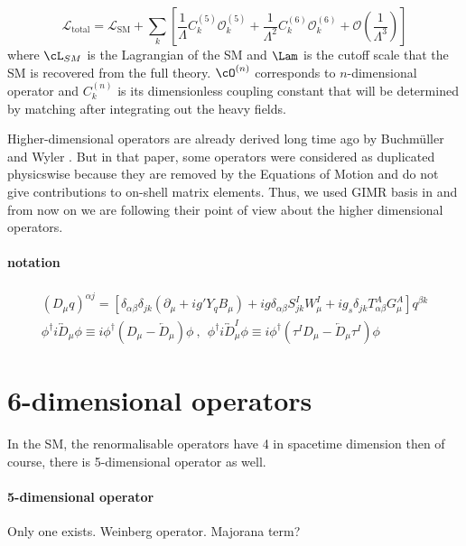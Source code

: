 \begin{equation} 
\mathcal{L}_{\mathrm{total}} = \mathcal{L}_{\mathrm{SM}} 
+ \sum_{k}\left[ \frac{1}{\Lambda} C_k^{(5)} \mathcal{O}_k^{(5)}
+ \frac{1}{\Lambda^2} C_k^{(6)} \mathcal{O}_k^{(6)} + \mathcal{O}\left(\frac{1}{\Lambda^3}\right) \right]
\end{equation}
where $\cL_{SM}$ is the Lagrangian of the SM and $\Lam$ is the cutoff scale that the SM is recovered from the full theory.
$\cO^{(n)}$ corresponds to $n$-dimensional operator 
and $C_k^{(n)}$ is its dimensionless coupling constant
that will be determined by matching after integrating out the heavy fields. 

Higher-dimensional operators are already derived long time ago by Buchm\"{u}ller and Wyler .
But in that paper, some operators were considered as duplicated physicswise
because they are removed by the Equations of Motion and do not give contributions to on-shell matrix elements.
Thus, we used GIMR basis in  and from now on we are following their point of view about the higher dimensional operators. 


\paragraph{notation}
\begin{align}
 (D_\mu q)^{\alpha j} = [\delta_{\alpha \beta} \delta_{jk}(\partial_\mu + ig'Y_qB_\mu)
  + ig \delta_{\alpha\beta}S_{jk}^I W_\mu^I + ig_s \delta_{jk} T_{\alpha\beta}^A G_\mu^A] q^{\beta k}\nonumber\\
  \phi^\dagger i \overleftrightarrow{D}_\mu \phi \equiv i\phi^\dagger (D_\mu - \overleftarrow{D}_\mu)\phi~,
~~\phi^\dagger i \overleftrightarrow{D}_\mu^I \phi \equiv 
i\phi^\dagger (\tau^I D_\mu - \overleftarrow{D}_\mu \tau^I)\phi
\end{align}


\section{6-dimensional operators}
In the SM, the renormalisable operators have 4 in spacetime dimension then of course, there is 5-dimensional operator as well.
\paragraph{5-dimensional operator}
Only one exists. Weinberg operator. Majorana term?



